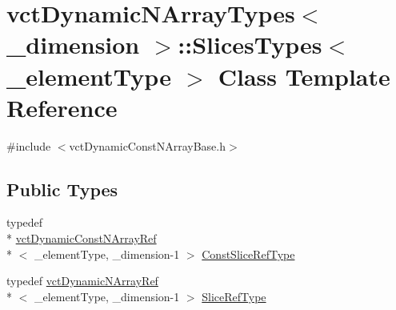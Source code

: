 \hypertarget{classvct_dynamic_n_array_types_1_1_slices_types}{\section{vct\-Dynamic\-N\-Array\-Types$<$ \-\_\-dimension $>$\-:\-:Slices\-Types$<$ \-\_\-element\-Type $>$ Class Template Reference}
\label{classvct_dynamic_n_array_types_1_1_slices_types}
}


{\ttfamily \#include $<$vct\-Dynamic\-Const\-N\-Array\-Base.\-h$>$}

\subsection*{Public Types}
\begin{DoxyCompactItemize}
\item 
typedef \\*
\hyperlink{classvct_dynamic_const_n_array_ref}{vct\-Dynamic\-Const\-N\-Array\-Ref}\\*
$<$ \-\_\-element\-Type, \-\_\-dimension-\/1 $>$ \hyperlink{classvct_dynamic_n_array_types_1_1_slices_types_acf1ea70846d0d2739fce728d3c99bde3}{Const\-Slice\-Ref\-Type}
\item 
typedef \hyperlink{classvct_dynamic_n_array_ref}{vct\-Dynamic\-N\-Array\-Ref}\\*
$<$ \-\_\-element\-Type, \-\_\-dimension-\/1 $>$ \hyperlink{classvct_dynamic_n_array_types_1_1_slices_types_a3eac136f0c4ca03f30cf55cdd608ebf8}{Slice\-Ref\-Type}
\end{DoxyCompactItemize}
